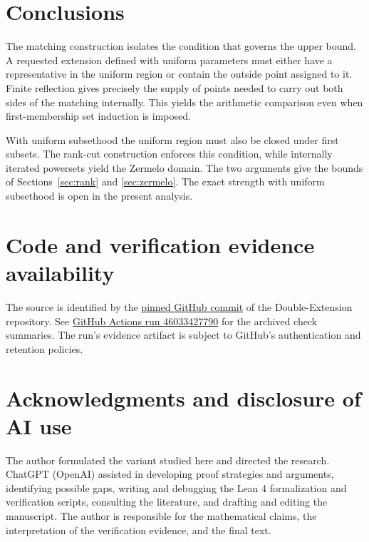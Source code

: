 \documentclass[11pt,a4paper]{article}
\numberwithin{equation}{section}
\theoremstyle{definition}
\theoremstyle{remark}
\begin{document}
\section{Conclusions}
The matching construction isolates the condition that governs the upper bound. A requested extension defined with uniform parameters must either have a representative in the uniform region or contain the outside point assigned to it. Finite reflection gives precisely the supply of points needed to carry out both sides of the matching internally. This yields the arithmetic comparison even when first-membership set induction is imposed.

With uniform subsethood the uniform region must also be closed under first subsets. The rank-cut construction enforces this condition, while internally iterated powersets yield the Zermelo domain. The two arguments give the bounds of Sections~\ref{sec:rank} and \ref{sec:zermelo}. The exact strength with uniform subsethood is open in the present analysis.

\section*{Code and verification evidence availability}
The source is identified by the \href{https://github.com/zaljohar/Double-Extension/tree/4a170802b75462a01925b065e89c1ed5383af122}{pinned GitHub commit} of the Double-Extension repository. See \href{https://github.com/zaljohar/Double-Extension/actions/runs/46033427790}{GitHub Actions run 46033427790} for the archived check summaries. The run's evidence artifact is subject to GitHub's authentication and retention policies.

\section*{Acknowledgments and disclosure of AI use}
The author formulated the variant studied here and directed the research. ChatGPT (OpenAI) assisted in developing proof strategies and arguments, identifying possible gaps, writing and debugging the Lean 4 formalization and verification scripts, consulting the literature, and drafting and editing the manuscript. The author is responsible for the mathematical claims, the interpretation of the verification evidence, and the final text.
\end{document}
